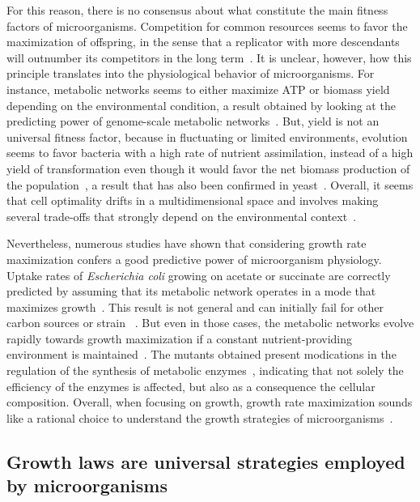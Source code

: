 For this reason, there is no consensus about what constitute the main fitness factors of microorganisms.
Competition for common resources seems to favor the maximization of offspring, in the sense that a replicator with more descendants will outnumber its competitors in the long term~\cite{dawkins_selfish_1976}.
It is unclear, however, how this principle translates into the physiological behavior of microorganisms.
For instance, metabolic networks seems to either maximize ATP or biomass yield depending on the environmental condition, a result obtained by looking at the predicting power of genome-scale metabolic networks~\cite{schuetz_systematic_2007}.
But, yield is not an universal fitness factor, because in fluctuating or limited environments, evolution seems to favor bacteria with a high rate of nutrient assimilation, instead of a high yield of transformation even though it would favor the net biomass production of the population~\cite{frank_tradeoff_2010,maclean_tragedy_2008}, a result that has also been confirmed in yeast~\cite{schuster_maximization_2008}.
Overall, it seems that cell optimality drifts in a multidimensional space and involves making several trade-offs that strongly depend on the environmental context~\cite{schuetz_multidimensional_2012}.

Nevertheless, numerous studies have shown that considering growth rate maximization confers a good predictive power of microorganism physiology.
Uptake rates of \textit{Escherichia coli} growing on acetate or succinate are correctly predicted by assuming that its metabolic network operates in a mode that maximizes growth~\cite{edwards_silico_2001}.
This result is not general and can initially fail for other carbon sources or strain~ \cite{ibarra_escherichia_2002}.
But even in those cases, the metabolic networks evolve rapidly towards growth maximization if a constant nutrient-providing environment is maintained~\cite{ibarra_escherichia_2002}.
The mutants obtained present modications in the regulation of the synthesis of metabolic enzymes~\cite{lewis_omic_2010}, indicating that not solely the efficiency of the enzymes is affected, but also as a consequence the cellular composition.
Overall, when focusing on growth, growth rate maximization sounds like a rational choice to understand the growth strategies of microorganisms~\cite{molenaar_shifts_2009}.

\subsection{Growth laws are universal strategies employed by microorganisms}

